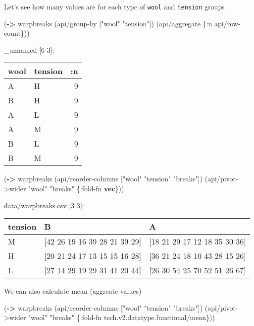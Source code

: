 \documentclass[]{article}
\newenvironment{Shaded}{\begin{snugshade}}{\end{snugshade}}
\newcommand{\KeywordTok}[1]{\textcolor[rgb]{0.13,0.29,0.53}{\textbf{#1}}}
\newcommand{\StringTok}[1]{\textcolor[rgb]{0.31,0.60,0.02}{#1}}
\newcommand{\AttributeTok}[1]{\textcolor[rgb]{0.77,0.63,0.00}{#1}}
\newcommand{\NormalTok}[1]{#1}
\begin{document}
Let's see how many values are for each type of \texttt{wool} and
\texttt{tension} groups

\begin{Shaded}
\begin{Highlighting}[]
\NormalTok{(}\KeywordTok{->}\NormalTok{ warpbreaks}
\NormalTok{    (api/group-by [}\StringTok{"wool"} \StringTok{"tension"}\NormalTok{])}
\NormalTok{    (api/aggregate \{}\AttributeTok{:n}\NormalTok{ api/row-count\}))}
\end{Highlighting}
\end{Shaded}

\_unnamed {[}6 3{]}:

\begin{longtable}[]{@{}llr@{}}
\toprule
wool & tension & :n\tabularnewline
\midrule
\endhead
A & H & 9\tabularnewline
B & H & 9\tabularnewline
A & L & 9\tabularnewline
A & M & 9\tabularnewline
B & L & 9\tabularnewline
B & M & 9\tabularnewline
\bottomrule
\end{longtable}

\begin{Shaded}
\begin{Highlighting}[]
\NormalTok{(}\KeywordTok{->}\NormalTok{ warpbreaks}
\NormalTok{    (api/reorder-columns [}\StringTok{"wool"} \StringTok{"tension"} \StringTok{"breaks"}\NormalTok{])}
\NormalTok{    (api/pivot->wider }\StringTok{"wool"} \StringTok{"breaks"}\NormalTok{ \{}\AttributeTok{:fold-fn} \KeywordTok{vec}\NormalTok{\}))}
\end{Highlighting}
\end{Shaded}

data/warpbreaks.csv {[}3 3{]}:

\begin{longtable}[]{@{}lll@{}}
\toprule
tension & B & A\tabularnewline
\midrule
\endhead
M & {[}42 26 19 16 39 28 21 39 29{]} & {[}18 21 29 17 12 18 35 30
36{]}\tabularnewline
H & {[}20 21 24 17 13 15 15 16 28{]} & {[}36 21 24 18 10 43 28 15
26{]}\tabularnewline
L & {[}27 14 29 19 29 31 41 20 44{]} & {[}26 30 54 25 70 52 51 26
67{]}\tabularnewline
\bottomrule
\end{longtable}

We can also calculate mean (aggreate values)

\begin{Shaded}
\begin{Highlighting}[]
\NormalTok{(}\KeywordTok{->}\NormalTok{ warpbreaks}
\NormalTok{    (api/reorder-columns [}\StringTok{"wool"} \StringTok{"tension"} \StringTok{"breaks"}\NormalTok{])}
\NormalTok{    (api/pivot->wider }\StringTok{"wool"} \StringTok{"breaks"}\NormalTok{ \{}\AttributeTok{:fold-fn}\NormalTok{ tech.v2.datatype.functional/mean\}))}
\end{Highlighting}
\end{Shaded}
\end{document}
